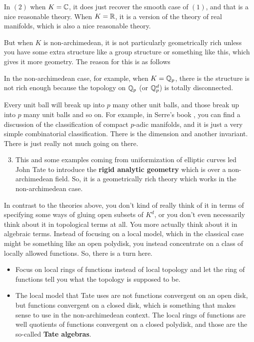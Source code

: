 In $(2)$ when $K = \Bbb{C}$, it does just recover the smooth case of $(1)$, and that is a nice reasonable theory. When $K = \Bbb{R}$, it is a version of the theory of real manifolds, which is also a nice reasonable theory. 

But when $K$ is non-archimedean, it is not particularly geometrically rich unless you have some extra structure like a group structure or something like this, which gives it more geometry. The reason for this is as follows 



In the non-archimedean case, for example, when $K=\Bbb{Q}_p$, there is the structure is not rich enough because the topology on $\Bbb{Q}_p$ (or $\Bbb{Q}_p^{d}$) is totally disconnected.

\begin{remark}
    Every unit ball will break up into $p$ many other unit balls, and those break up into $p$ many unit balls and so on. For example, in Serre's book \citeme{}, you can find a discussion of the classification of compact $p$-adic manifolds, and it is just a very simple combinatorial classification. There is the dimension and another invariant. There is just really not much going on there.
\end{remark}
    
\begin{enumerate}
    \setcounter{enumi}{2} 
    
    \item  This and some examples coming from uniformization of elliptic curves led John Tate \citeme{} to introduce the \textbf{rigid analytic geometry} which is over a non-archimedean field. So, it is a geometrically rich theory which works in the non-archimedean case. 
\end{enumerate}



In contrast to the theories above, you don't kind of really think of it in terms of specifying some ways of gluing open subsets of $K^{d}$, or you don't even necessarily think about it in topological terms at all. You more actually think about it in algebraic terms. Instead of focusing on a local model, which in the classical case might be something like an open polydisk, you instead concentrate on a class of locally allowed functions. So, there is a turn here. 

\begin{itemize}
    \item Focus on local rings of functions instead of local topology and let the ring of functions tell you what the topology is supposed to be.

    \item The local model that Tate uses are not functions convergent on an open disk, but functions convergent on a closed disk, which is something that makes sense to use in the non-archimedean context. The local rings of functions are well quotients of functions convergent on a closed polydisk, and those are the so-called \textbf{Tate algebras}.
\end{itemize}

